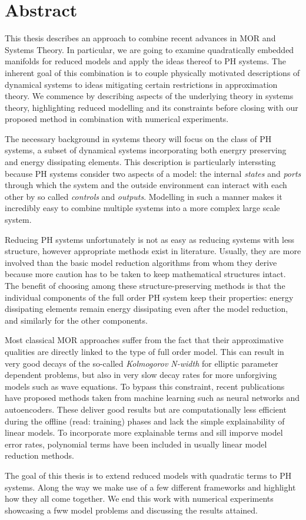 \chapter*{Abstract}

This thesis describes an approach to combine recent advances in \ac{MOR} and Systems Theory.
In particular, we are going to examine quadratically embedded manifolds for reduced models and apply the ideas thereof to \ac{PH} systems.
The inherent goal of this combination is to couple physically motivated descriptions of dynamical systems to ideas mitigating certain restrictions in approximation theory.
We commence by describing aspects of the underlying theory in systems theory, highlighting reduced modelling and its constraints before closing with our proposed method in combination with numerical experiments.

The necessary background in systems theory will focus on the class of \ac{PH} systems, a subset of dynamical systems incorporating both energry preserving and energy dissipating elements.
This description is particularly interssting because \ac{PH} systems consider two aspects of a model: the internal \emph{states} and \emph{ports} through which the system and the outside environment can interact with each other by so called \emph{controls} and \emph{outputs}.
Modelling in such a manner makes it incredibly easy to combine multiple systems into a more complex large scale system.

Reducing \ac{PH} systems unfortunately is not as easy as reducing systems with less structure, however appropriate methods exist in literature.
Usually, they are more involved than the basic model reduction algorithms from whom they derive because more caution has to be taken to keep mathematical structures intact.
The benefit of choosing among these structure-preserving methods is that the individual components of the full order \ac{PH} system keep their properties: energy dissipating elements remain energy dissipating even after the model reduction, and similarly for the other components.

Most classical \ac{MOR} approaches suffer from the fact that their approximative qualities are directly linked to the type of full order model.
This can result in very good decays of the so-called \emph{Kolmogorov N-width} for elliptic parameter dependent problems, but also in very slow decay rates for more unforgiving models such as wave equations.
To bypass this constraint, recent publications have proposed methods taken from machine learning such as neural networks and autoencoders.
These deliver good results but are computationally less efficient during the offline (read: training) phases and lack the simple explainability of linear models.
To incorporate more explainable terms and sill imporve model error rates, polynomial terms have been included in usually linear model reduction methods.

The goal of this thesis is to extend reduced models with quadratic terms to \ac{PH} systems.
Along the way we make use of a few different frameworks and highlight how they all come together.
We end this work with numerical experiments showcasing a fww model problems and discussing the results attained.
